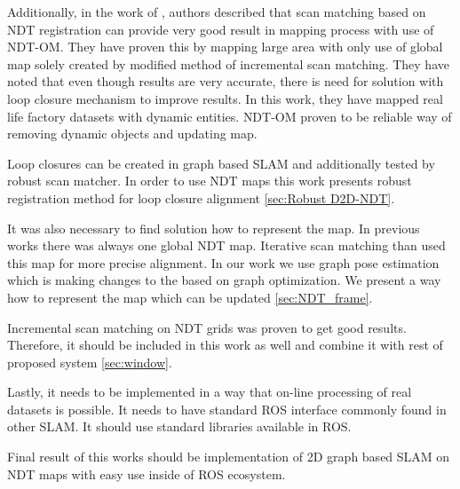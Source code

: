 Additionally, in the work of \cite{NDTOMFusion}, authors described that scan matching based on \gls{NDT} registration can provide very good result in mapping process with use of \gls{NDT-OM}. They have proven this by mapping large area with only use of global map solely created by modified method of incremental scan matching. They have noted that even though results are very accurate, there is need for solution with loop closure mechanism to improve results. In this work, they have mapped real life factory datasets with dynamic entities. \gls{NDT-OM} proven to be reliable way of removing dynamic objects and updating map.

Loop closures can be created in graph based \gls{SLAM} and additionally tested by robust scan matcher. In order to use \gls{NDT} maps this work presents robust registration method for loop closure alignment \ref{sec:Robust D2D-NDT}. 

It was also necessary to find solution how to represent the map. In previous works there was always one global \gls{NDT} map. Iterative scan matching than used this map for more precise alignment. In our work we use graph pose estimation which is making changes to the based on graph optimization. We present a way how to represent the map which can be updated \ref{sec:NDT_frame}.

Incremental scan matching on \gls{NDT} grids was proven to get good results. Therefore, it should be included in this work as well and combine it with rest of proposed system \ref{sec:window}.   

Lastly, it needs to be implemented in a way that on-line processing of real datasets is possible. It needs to have standard \gls{ROS} interface commonly found in other \gls{SLAM}. It should use standard libraries available in \gls{ROS}.

Final result of this works should be implementation of 2D graph based \gls{SLAM} on \gls{NDT} maps with easy use inside of \gls{ROS} ecosystem. 